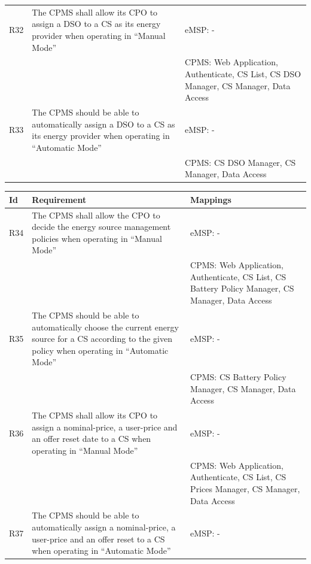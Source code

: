 \documentclass[11pt]{article}
\begin{document}
\begin{table}[H]
\begin{tabularx}{\textwidth}{|>{\centering\hsize=0.15\hsize}X|>{\hsize=1.425\hsize}X|>{\hsize=1.425\hsize}X|}
        \hline
        R32 & The CPMS shall allow its CPO to assign a DSO to a CS as its energy provider  when operating in “Manual Mode” & eMSP: - \\
        & & CPMS: Web Application, Authenticate, CS List, CS DSO Manager, CS Manager, Data Access \\
        \hline
        R33 & The CPMS should be able to automatically assign a DSO to a CS as its energy provider when operating in “Automatic Mode” & eMSP: - \\
        & & CPMS: CS DSO Manager, CS Manager, Data Access \\
        \hline
    \end{tabularx}
    \label{tab:requirements}
\end{table}

\begin{table}[H]
    \centering
    \setlength{\tabcolsep}{18pt}
    \renewcommand{\arraystretch}{1.2}
    \begin{tabularx}{\textwidth}{|>{\centering\hsize=0.15\hsize}X|>{\hsize=1.425\hsize}X|>{\hsize=1.425\hsize}X|}
        \hline
        \textbf{Id} & \textbf{Requirement} & \textbf{Mappings} \\
        \hline
        R34 & The CPMS shall allow the CPO to decide the energy source management policies when operating in “Manual Mode” & eMSP: - \\
        & & CPMS: Web Application, Authenticate, CS List, CS Battery Policy Manager, CS Manager, Data Access \\
        \hline
        R35 & The CPMS should be able to automatically choose the current energy source for a CS according to the given policy when operating in “Automatic Mode” & eMSP: - \\
        & & CPMS: CS Battery Policy Manager, CS Manager, Data Access \\
        \hline
        R36 & The CPMS shall allow its CPO to assign a nominal-price, a user-price and an offer reset date to a CS when operating in “Manual Mode” & eMSP: - \\
        & & CPMS: Web Application, Authenticate, CS List, CS Prices Manager, CS Manager, Data Access \\
        \hline
        R37 & The CPMS should be able to automatically assign a nominal-price, a user-price and an offer reset to a CS when operating in “Automatic Mode” & eMSP: - \\

\end{tabularx}
\end{table}
\end{document}
